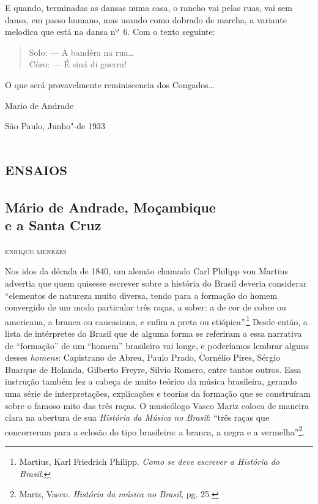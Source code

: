 E quando, terminadas as dansas numa casa, o rancho vai pelas ruas, vai
sem dansa, em passo humano, mas usando como dobrado de marcha, a
variante melodica que está na dansa nº~6. Com o texto seguinte:

\begin{verse}
Solo: --- A bandêra na rua\ldots{}\\
Côro: --- É siná di guerra!\\[5pt]
\end{verse}

\noindent{}O que será provavelmente reminiscencia dos Congados\ldots{}

\begin{flushright}
\vfill
Mario de Andrade

São Paulo, Junho"-de 1933
\end{flushright}

\part{\textsc{ensaios}}

\chapter*{Mário de Andrade, Moçambique\\ e a Santa Cruz}

\begin{flushright}
\textsc{enrique menezes}
\end{flushright}

Nos idos da década de 1840, um alemão chamado Carl Philipp von Martius
advertia que quem quisesse escrever sobre a história do Brasil deveria
considerar ``elementos de natureza muito diversa, tendo para a formação
do homem convergido de um modo particular três raças, a saber: a de cor
de cobre ou americana, a branca ou caucasiana, e enfim a preta ou
etiópica''.\footnote{Martius, Karl Friedrich Philipp. \emph{Como se deve
  escrever a História do Brasil}.} Desde então, a lista de intérpretes
do Brasil que de alguma forma se referiram a essa narrativa de
``formação'' de um ``homem'' brasileiro vai longe, e poderíamos lembrar
alguns desses \emph{homens}: Capistrano de Abreu, Paulo Prado, Cornélio
Pires, Sérgio Buarque de Holanda, Gilberto Freyre, Silvio Romero, entre
tantos outros. Essa instrução também fez a cabeça de muito teórico da
música brasileira, gerando uma série de interpretações, explicações e
teorias da formação que se construíram sobre o famoso mito das três
raças. O musicólogo Vasco Mariz coloca de maneira clara na abertura de
sua \emph{História da Música no Brasil}: ``três raças que concorreram
para a eclosão do tipo brasileiro: a branca, a negra e a
vermelha''\footnote{Mariz, Vasco. \emph{História da música no Brasil},
  pg. 25.}.

